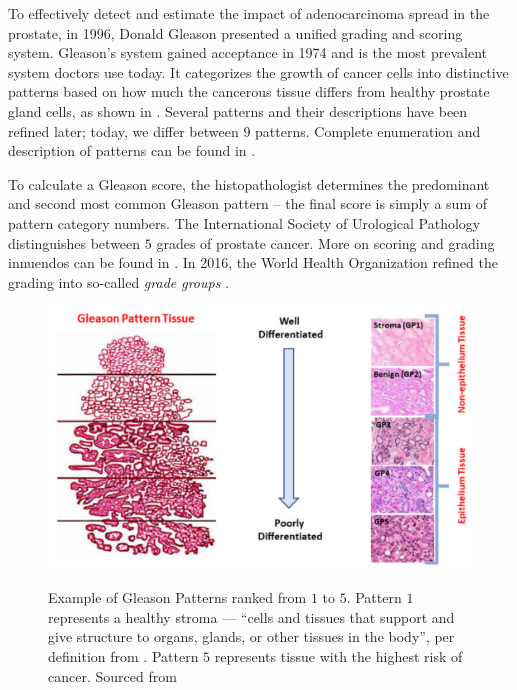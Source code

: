 To effectively detect and estimate the impact of adenocarcinoma spread in the prostate, in 1996, Donald Gleason presented a unified grading and scoring system.
Gleason's system gained acceptance in 1974 and is the most prevalent system doctors use today.
It categorizes the growth of cancer cells into distinctive patterns based on how much the cancerous tissue differs from healthy prostate gland cells, as shown in .
Several patterns and their descriptions have been refined later; today, we differ between 9 patterns. Complete enumeration and description of patterns can be found in \cite{gleason-patterns}.

To calculate a Gleason score, the histopathologist determines the predominant and second most common Gleason pattern -- the final score is simply a sum of pattern category numbers. The International Society of Urological Pathology distinguishes between $5$ grades of prostate cancer. More on scoring and grading innuendos can be found in \cite{gleason-pattern-grading}.
In 2016, the World Health Organization refined the grading into so-called \emph{grade groups} \cite{who-grade-groups}.

\begin{figure}
    \begin{center}
    \begin{minipage}{1\textwidth}
      {\includegraphics[width=\textwidth]{img/gp-classification.png}}
    \end{minipage}
    \caption{Example of Gleason Patterns ranked from $1$ to $5$. Pattern $1$ represents a healthy stroma --- ``cells and tissues that support and give structure to organs, glands, or other tissues in the body'', per definition from \cite{nci-stroma}. Pattern $5$ represents tissue with the highest risk of cancer. Sourced from \cite{gleason-pattern-description}}
    \label{fig:gp}
    \end{center}
\end{figure}

